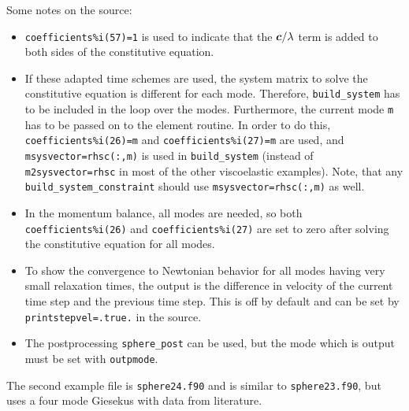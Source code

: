 Some notes on the source:
\begin{itemize}
   \item 
     \texttt{coefficients\%i(57)=1} is used to indicate that the
     $\boldsymbol{c}/\lambda$ term is added to both sides of the
     constitutive equation.
   \item 
     If these adapted time schemes are used, the system matrix to solve the
     constitutive equation is different for each mode. Therefore, 
     \texttt{build\_system} has to be included in the loop over the modes. 
     Furthermore, the current mode \texttt{m} has to be passed on to the 
     element routine.
     In order to do this, \texttt{coefficients\%i(26)=m} and 
     \texttt{coefficients\%i(27)=m} are used, and 
     \texttt{msysvector=rhsc(:,m)} is used in \texttt{build\_system} 
     (instead of \texttt{m2sysvector=rhsc} in most of the other 
     viscoelastic examples). Note, that any \texttt{build\_system\_constraint}
     should use \texttt{msysvector=rhsc(:,m)} as well.
   \item
     In the momentum balance, all modes are needed, so both 
     \texttt{coefficients\%i(26)} and \texttt{coefficients\%i(27)} 
     are set to zero after solving the constitutive equation for all modes.
   \item
     To show the convergence to Newtonian behavior for all modes having very
     small relaxation times, the output is the 
     difference in velocity of the current time step and the previous 
     time step. This is off by default and can be set by
     \texttt{printstepvel=.true.} in the source.
   \item The postprocessing \texttt{sphere\_post} can be used, but the mode
     which is output must be set with \texttt{outpmode}.
\end{itemize}
The second example file is \texttt{sphere24.f90} and is similar to
\texttt{sphere23.f90}, but uses a four mode Giesekus with data from literature.
